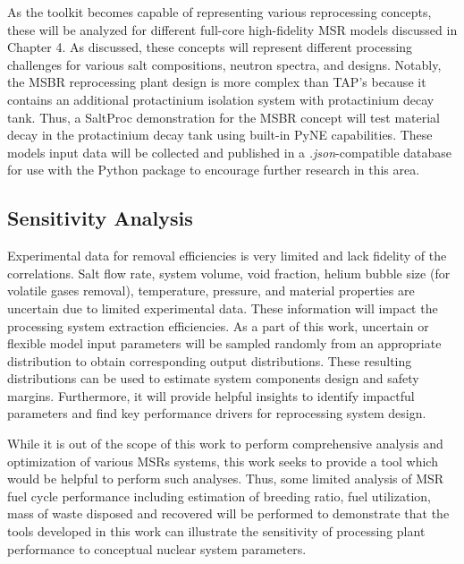 As the toolkit becomes capable of representing various reprocessing 
concepts, these will be analyzed for different full-core 
high-fidelity \gls{MSR} models discussed in Chapter 4. As discussed, 
these concepts will represent different processing challenges 
for various salt compositions, neutron spectra, and designs. 
Notably, the \gls{MSBR} reprocessing plant design is more complex 
than \gls{TAP}'s because it contains an additional protactinium 
isolation system with protactinium decay tank. Thus, a SaltProc 
demonstration for the \gls{MSBR} concept will test material decay 
in the protactinium decay tank using built-in PyNE capabilities. 
These models input data will be collected and 
published in a \textit{.json}-compatible database for use with the 
Python package to encourage further research in this area.

\subsection{Sensitivity Analysis}
Experimental data for removal efficiencies is very limited and lack 
fidelity of the correlations. Salt flow rate, system volume, 
void fraction, helium bubble size (for volatile gases removal), 
temperature, pressure, and material properties are uncertain due to 
limited experimental data. These information will impact the 
processing system extraction efficiencies. As a part of this work, 
uncertain or flexible model input parameters will be sampled randomly 
from an appropriate distribution to obtain corresponding output 
distributions. These resulting distributions can be used to estimate 
system components design and safety margins. Furthermore, it will 
provide helpful insights to identify impactful parameters and 
find key performance drivers for reprocessing system design.

While it is out of the scope of this work to perform comprehensive 
analysis and optimization of various \glspl{MSR} systems, this 
work seeks to provide a tool which would be helpful to perform such 
analyses. Thus, some limited analysis of \gls{MSR} fuel cycle 
performance including estimation of breeding ratio, fuel utilization, 
mass of waste disposed and recovered will be performed to demonstrate 
that the tools developed in this work can illustrate the sensitivity 
of processing plant performance to conceptual nuclear system parameters.